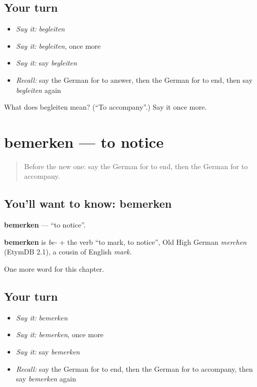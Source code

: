 \subsection*{Your turn}
\begin{itemize}
\raggedright
  \item \emph{Say it:} \emph{begleiten}
  \item \emph{Say it:} \emph{begleiten}, once more
  \item \emph{Say it:} say \emph{begleiten}
  \item \emph{Recall:} say the German for to answer, then the German for to end, then say \emph{begleiten} again
\end{itemize}

\begin{tcolorbox}[breakable,colback=teal!4,colframe=teal!35!black,title={Before you move on}]
What does begleiten mean? (\textquotedblleft{}To accompany\textquotedblright{}.) Say it once more.
\end{tcolorbox}
\section[bemerken]{bemerken — to notice}

\label{lesson:GE-C246-bemerken}



\begin{quote}
Before the new one: say the German for to end, then the German for to accompany.
\end{quote}

\subsection*{You'll want to know: bemerken}
\textbf{bemerken} — \textquotedblleft{}to notice\textquotedblright{}.

\begin{cousinweb}
\textbf{bemerken} is \emph{be-} + the verb \textquotedblleft{}to mark, to notice\textquotedblright{}, Old High German \emph{merchen} (EtymDB 2.1), a cousin of English \emph{mark}.
\end{cousinweb}

\begin{grammarlens}[title={What you've built}]
One more word for this chapter.
\end{grammarlens}

\subsection*{Your turn}
\begin{itemize}
\raggedright
  \item \emph{Say it:} \emph{bemerken}
  \item \emph{Say it:} \emph{bemerken}, once more
  \item \emph{Say it:} say \emph{bemerken}
  \item \emph{Recall:} say the German for to end, then the German for to accompany, then say \emph{bemerken} again
\end{itemize}

